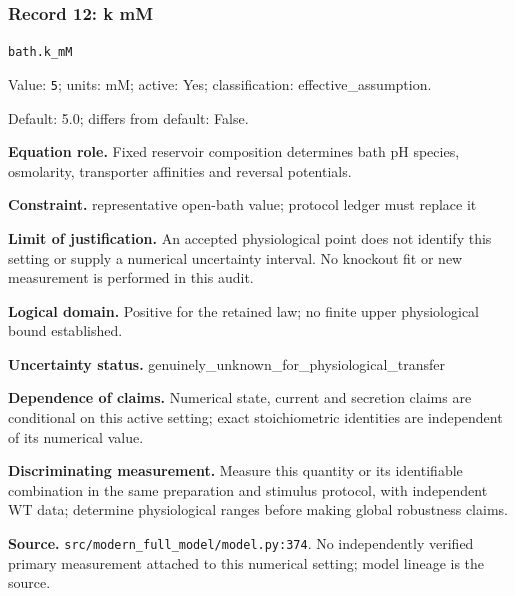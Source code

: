 \subsubsection*{Record 12: k mM}
{\small \nolinkurl{bath.k_mM}\par

Value: \texttt{5}; units: mM; active: Yes; classification: effective\_assumption.\par

Default: 5.0; differs from default: False.\par

\textbf{Equation role.} Fixed reservoir composition determines bath pH species, osmolarity, transporter affinities and reversal potentials.\par

\textbf{Constraint.} representative open-bath value; protocol ledger must replace it\par

\textbf{Limit of justification.} An accepted physiological point does not identify this setting or supply a numerical uncertainty interval. No knockout fit or new measurement is performed in this audit.\par

\textbf{Logical domain.} Positive for the retained law; no finite upper physiological bound established.\par

\textbf{Uncertainty status.} genuinely\_unknown\_for\_physiological\_transfer\par

\textbf{Dependence of claims.} Numerical state, current and secretion claims are conditional on this active setting; exact stoichiometric identities are independent of its numerical value.\par

\textbf{Discriminating measurement.} Measure this quantity or its identifiable combination in the same preparation and stimulus protocol, with independent WT data; determine physiological ranges before making global robustness claims.\par

\textbf{Source.} \nolinkurl{src/modern_full_model/model.py:374}. No independently verified primary measurement attached to this numerical setting; model lineage is the source.\par}

